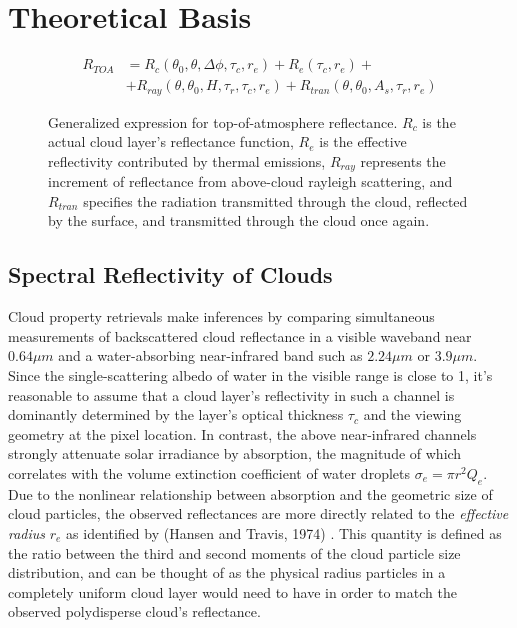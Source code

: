 \documentclass[12pt]{article}
\begin{document}

\clearpage

\section{Theoretical Basis}

\begin{figure}[h!]
    \begin{equation}\label{toa_ref}
        \begin{split}
            R_{TOA} &= R_c(\theta_0, \theta, \Delta \phi, \tau_c, r_e) + R_e(\tau_c, r_e) + \\
            &+ R_{ray}(\theta, \theta_0, H, \tau_r, \tau_c, r_e) + R_{tran}(\theta, \theta_0, A_s, \tau_r, r_e) %
        \end{split}
    \end{equation}
    \caption{Generalized expression for top-of-atmosphere reflectance. $R_c$ is the actual cloud layer's reflectance function, $R_e$ is the effective reflectivity contributed by thermal emissions, $R_{ray}$ represents the increment of reflectance from above-cloud rayleigh scattering, and $R_{tran}$ specifies the radiation transmitted through the cloud, reflected by the surface, and transmitted through the cloud once again.}
\end{figure}

\subsection{Spectral Reflectivity of Clouds}

Cloud property retrievals make inferences by comparing simultaneous measurements of backscattered cloud reflectance in a visible waveband near $0.64\mu m$ and a water-absorbing near-infrared band such as $2.24\mu m$ or $3.9\mu m$. Since the single-scattering albedo of water in the visible range is close to 1, it's reasonable to assume that a cloud layer's reflectivity in such a channel is dominantly determined by the layer's optical thickness $\tau_c$ and the viewing geometry at the pixel location. In contrast, the above near-infrared channels strongly attenuate solar irradiance by absorption, the magnitude of which correlates with the volume extinction coefficient of water droplets $\sigma_e = \pi r^2 Q_e$. Due to the nonlinear relationship between absorption and the geometric size of cloud particles, the observed reflectances are more directly related to the \textit{effective radius} $r_e$ as identified by (Hansen and Travis, 1974) \cite{hansen_light_1974}. This quantity is defined as the ratio between the third and second moments of the cloud particle size distribution, and can be thought of as the physical radius particles in a completely uniform cloud layer would need to have in order to match the observed polydisperse cloud's reflectance.
\end{document}

